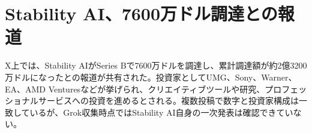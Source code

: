 \section{Stability AI、7600万ドル調達との報道}
X上では、Stability AIがSeries Bで7600万ドルを調達し、累計調達額が約2億3200万ドルになったとの報道が共有された。投資家としてUMG、Sony、Warner、EA、AMD Venturesなどが挙げられ、クリエイティブツールや研究、プロフェッショナルサービスへの投資を進めるとされる。複数投稿で数字と投資家構成は一致しているが、Grok収集時点ではStability AI自身の一次発表は確認できていない。
